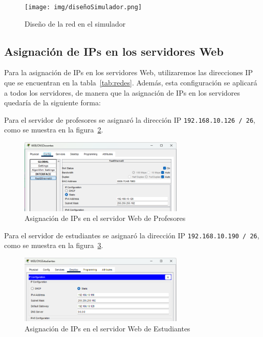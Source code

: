     \begin{figure}[H]
        \centering
        \texttt{[image: img/diseñoSimulador.png]}
        \caption{Diseño de la red en el simulador}
        \label{fig:disSim}
    \end{figure}
    
    \subsection*{Asignación de IPs en los servidores Web}

    Para la asignación de IPs en los servidores Web, utilizaremos las direcciones IP que se encuentran en la tabla~\ref{tab:redes}. Además, esta configuración se aplicará a todos los servidores, de manera que la asignación de IPs en los servidores quedaría de la siguiente forma:

    Para el servidor de profesores se asignaró la dirección IP \texttt{192.168.10.126 / 26}, como se muestra en la figura~\ref{fig:serProf_IP}. 
    
    \begin{figure}[H]
        \centering
        \includegraphics[width=0.7\textwidth]{img/serverprofesores.png}
        \caption{Asignación de IPs en el servidor Web de Profesores}
        \label{fig:serProf_IP}
    \end{figure}

    Para el servidor de estudiantes se asignaró la dirección IP \texttt{192.168.10.190 / 26}, como se muestra en la figura~\ref{fig:serEs_IP}.

    \begin{figure}[H]
        \centering
        \includegraphics[width=0.7\textwidth]{img/serverestudiantes.png}
        \caption{Asignación de IPs en el servidor Web de Estudiantes}
        \label{fig:serEs_IP}
    \end{figure}

